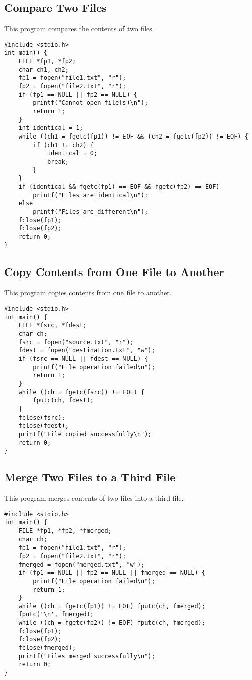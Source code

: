 \documentclass[a4paper,12pt]{article}
\begin{document}
\subsection{Compare Two Files}
This program compares the contents of two files.
\begin{lstlisting}[caption={Compare Two Files}]
#include <stdio.h>
int main() {
    FILE *fp1, *fp2;
    char ch1, ch2;
    fp1 = fopen("file1.txt", "r");
    fp2 = fopen("file2.txt", "r");
    if (fp1 == NULL || fp2 == NULL) {
        printf("Cannot open file(s)\n");
        return 1;
    }
    int identical = 1;
    while ((ch1 = fgetc(fp1)) != EOF && (ch2 = fgetc(fp2)) != EOF) {
        if (ch1 != ch2) {
            identical = 0;
            break;
        }
    }
    if (identical && fgetc(fp1) == EOF && fgetc(fp2) == EOF)
        printf("Files are identical\n");
    else
        printf("Files are different\n");
    fclose(fp1);
    fclose(fp2);
    return 0;
}
\end{lstlisting}
\clearpage

\subsection{Copy Contents from One File to Another}
This program copies contents from one file to another.
\begin{lstlisting}[caption={Copy Contents from One File to Another}]
#include <stdio.h>
int main() {
    FILE *fsrc, *fdest;
    char ch;
    fsrc = fopen("source.txt", "r");
    fdest = fopen("destination.txt", "w");
    if (fsrc == NULL || fdest == NULL) {
        printf("File operation failed\n");
        return 1;
    }
    while ((ch = fgetc(fsrc)) != EOF) {
        fputc(ch, fdest);
    }
    fclose(fsrc);
    fclose(fdest);
    printf("File copied successfully\n");
    return 0;
}
\end{lstlisting}
\clearpage

\subsection{Merge Two Files to a Third File}
This program merges contents of two files into a third file.
\begin{lstlisting}[caption={Merge Two Files to a Third File}]
#include <stdio.h>
int main() {
    FILE *fp1, *fp2, *fmerged;
    char ch;
    fp1 = fopen("file1.txt", "r");
    fp2 = fopen("file2.txt", "r");
    fmerged = fopen("merged.txt", "w");
    if (fp1 == NULL || fp2 == NULL || fmerged == NULL) {
        printf("File operation failed\n");
        return 1;
    }
    while ((ch = fgetc(fp1)) != EOF) fputc(ch, fmerged);
    fputc('\n', fmerged);
    while ((ch = fgetc(fp2)) != EOF) fputc(ch, fmerged);
    fclose(fp1);
    fclose(fp2);
    fclose(fmerged);
    printf("Files merged successfully\n");
    return 0;
}
\end{lstlisting}
\clearpage
\end{document}
